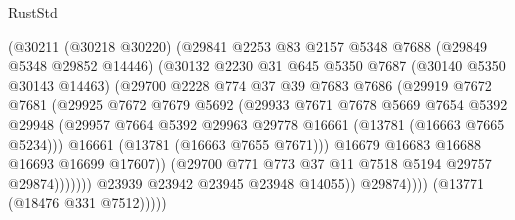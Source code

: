 \begin{lexlean}{RustStd}
\begin{coremodule}
                          (@30211
                            (@30218 @30220)
                            (@29841
                              @2253
                              @83
                              @2157
                              @5348
                              @7688
                              (@29849 @5348 @29852 @14446)
                              (@30132
                                @2230
                                @31
                                @645
                                @5350
                                @7687
                                (@30140 @5350 @30143 @14463)
                                (@29700
                                  @2228
                                  @774
                                  @37
                                  @39
                                  @7683
                                  @7686
                                  (@29919
                                    @7672
                                    @7681
                                    (@29925
                                      @7672
                                      @7679
                                      @5692
                                      (@29933
                                        @7671
                                        @7678
                                        @5669
                                        @7654
                                        @5392
                                        @29948
                                        (@29957
                                          @7664
                                          @5392
                                          @29963
                                          @29778
                                          @16661
                                          (@13781 (@16663 @7665 @5234)))
                                        @16661
                                        (@13781 (@16663 @7655 @7671)))
                                      @16679
                                      @16683
                                      @16688
                                      @16693
                                      @16699
                                      @17607))
                                  (@29700 @771 @773 @37 @11 @7518 @5194 @29757 @29874)))))))
                      @23939
                      @23942
                      @23945
                      @23948
                      @14055))
                  @29874))))
          (@13771 (@18476 @331 @7512)))))

\end{coremodule}
\end{lexlean}
